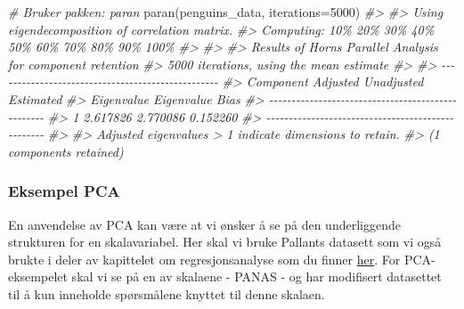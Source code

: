 \documentclass[
]{article}
\newenvironment{Shaded}{\begin{snugshade}}{\end{snugshade}}
\newcommand{\AttributeTok}[1]{\textcolor[rgb]{0.77,0.63,0.00}{#1}}
\newcommand{\CommentTok}[1]{\textcolor[rgb]{0.56,0.35,0.01}{\textit{#1}}}
\newcommand{\DecValTok}[1]{\textcolor[rgb]{0.00,0.00,0.81}{#1}}
\newcommand{\FunctionTok}[1]{\textcolor[rgb]{0.00,0.00,0.00}{#1}}
\newcommand{\NormalTok}[1]{#1}
\begin{document}
\begin{Shaded}
\begin{Highlighting}[]
\CommentTok{\# Bruker pakken: paran}
\FunctionTok{paran}\NormalTok{(penguins\_data, }\AttributeTok{iterations=}\DecValTok{5000}\NormalTok{)}
\CommentTok{\#\textgreater{} }
\CommentTok{\#\textgreater{} Using eigendecomposition of correlation matrix.}
\CommentTok{\#\textgreater{} Computing: 10\%  20\%  30\%  40\%  50\%  60\%  70\%  80\%  90\%  100\%}
\CommentTok{\#\textgreater{} }
\CommentTok{\#\textgreater{} }
\CommentTok{\#\textgreater{} Results of Horn\textquotesingle{}s Parallel Analysis for component retention}
\CommentTok{\#\textgreater{} 5000 iterations, using the mean estimate}
\CommentTok{\#\textgreater{} }
\CommentTok{\#\textgreater{} {-}{-}{-}{-}{-}{-}{-}{-}{-}{-}{-}{-}{-}{-}{-}{-}{-}{-}{-}{-}{-}{-}{-}{-}{-}{-}{-}{-}{-}{-}{-}{-}{-}{-}{-}{-}{-}{-}{-}{-}{-}{-}{-}{-}{-}{-}{-}{-}{-}{-} }
\CommentTok{\#\textgreater{} Component   Adjusted    Unadjusted    Estimated }
\CommentTok{\#\textgreater{}             Eigenvalue  Eigenvalue    Bias }
\CommentTok{\#\textgreater{} {-}{-}{-}{-}{-}{-}{-}{-}{-}{-}{-}{-}{-}{-}{-}{-}{-}{-}{-}{-}{-}{-}{-}{-}{-}{-}{-}{-}{-}{-}{-}{-}{-}{-}{-}{-}{-}{-}{-}{-}{-}{-}{-}{-}{-}{-}{-}{-}{-}{-} }
\CommentTok{\#\textgreater{} 1           2.617826    2.770086      0.152260}
\CommentTok{\#\textgreater{} {-}{-}{-}{-}{-}{-}{-}{-}{-}{-}{-}{-}{-}{-}{-}{-}{-}{-}{-}{-}{-}{-}{-}{-}{-}{-}{-}{-}{-}{-}{-}{-}{-}{-}{-}{-}{-}{-}{-}{-}{-}{-}{-}{-}{-}{-}{-}{-}{-}{-} }
\CommentTok{\#\textgreater{} }
\CommentTok{\#\textgreater{} Adjusted eigenvalues \textgreater{} 1 indicate dimensions to retain.}
\CommentTok{\#\textgreater{} (1 components retained)}
\end{Highlighting}
\end{Shaded}

\hypertarget{eksempel-pca}{%
\subsubsection{Eksempel PCA}\label{eksempel-pca}}

En anvendelse av PCA kan være at vi ønsker å se på den underliggende strukturen for en skalavariabel. Her skal vi bruke Pallants datasett som vi også brukte i deler av kapittelet om regresjonsanalyse som du finner \href{https://www.mheducation.co.uk/data-files}{her}. For PCA-eksempelet skal vi se på en av skalaene - PANAS - og har modifisert datasettet til å kun inneholde spørsmålene knyttet til denne skalaen.
\end{document}

